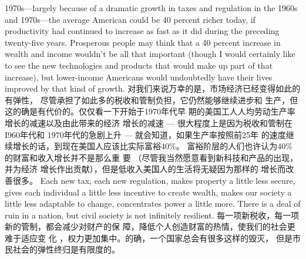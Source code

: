 \begin{paracol}{2}
1970s---largely because of a dramatic growth in taxes and regulation in the 1960s and 1970s---the average American could
be 40 percent richer today, if productivity had continued to increase as fast as it did during the preceding twenty-five years.
Prosperous people may think that a 40 percent increase in wealth and income wouldn't be all that important (though I
would certainly like to see the new technologies and products
that would make up part of that increase), but lower-income
Americans would undoubtedly have their lives improved by
that kind of growth.
\switchcolumn
对我们来说万幸的是，市场经济已经变得如此的有弹性，
尽管承担了如此多的税收和管制负担，它仍然能够继续进步和
生产，但这的确是有代价的。仅仅看一下开始于1970年代早
期的美国工人人均劳动生产率增长的减速以及由此带来的经济
增长的减速 --- 很大程度上是因为税收和管制在I960年代和
1970年代的急剧上升 --- 就会知道，如果生产率按照前25年
的速度继续增长的话，到现在美国人应该比实际富裕40\%。
富裕阶层的人们也许认为40\% 的财富和收入增长并不是那么重 要 （尽管我当然愿意看到新科技和产品的出现，并为经济
增长作出贡献），但是低收入美国人的生活将无疑因为那样的
增长而改善很多。
\switchcolumn*
Each new tax, each new regulation, makes property a little
less secure, gives each individual a little less incentive to create
wealth, makes our society a little less adaptable to change, concentrates power a little more. There is a deal of ruin in a nation,
but civil society is not infinitely resilient.
\switchcolumn
每一项新税收，每一项新的管制，都会减少对财产的保
障，降低个人创造财富的热情，使我们的社会更难于适应变
化 ，权力更加集中。的确，一个国家总会有很多这样的毁灭，
但是市民社会的弹性终归是有限度的。


\end{paracol}
